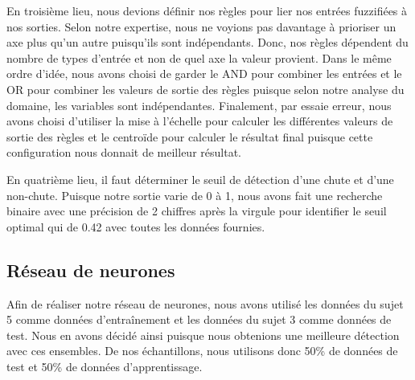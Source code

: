 \documentclass[12pt,letterpaper]{article}
\begin{document}
En troisième lieu, nous devions définir nos règles pour lier nos entrées fuzzifiées à nos sorties. Selon notre expertise, nous ne voyions pas davantage à prioriser un axe plus qu'un autre puisqu'ils sont indépendants. Donc, nos règles dépendent du nombre de types d'entrée et non de quel axe la valeur provient. Dans le même ordre d'idée, nous avons choisi de garder le AND pour combiner les entrées et le OR pour combiner les valeurs de sortie des règles puisque selon notre analyse du domaine, les variables sont indépendantes. Finalement, par essaie erreur, nous avons choisi d'utiliser la mise à l'échelle pour calculer les différentes valeurs de sortie des règles et le centroïde pour calculer le résultat final puisque cette configuration nous donnait de meilleur résultat.

En quatrième lieu, il faut déterminer le seuil de détection d'une chute et d'une non-chute. Puisque notre sortie varie de 0 à 1, nous avons fait une recherche binaire avec une précision de 2 chiffres après la virgule pour identifier le seuil optimal qui de 0.42 avec toutes les données fournies.

\subsection{Réseau de neurones} %

Afin de réaliser notre réseau de neurones, nous avons utilisé les données du sujet 5 comme données d'entraînement et les données du sujet 3 comme données de test. Nous en avons décidé ainsi puisque nous obtenions une meilleure détection avec ces ensembles. De nos échantillons, nous utilisons donc 50\%  de données de test et 50\% de données d'apprentissage.
\end{document}

